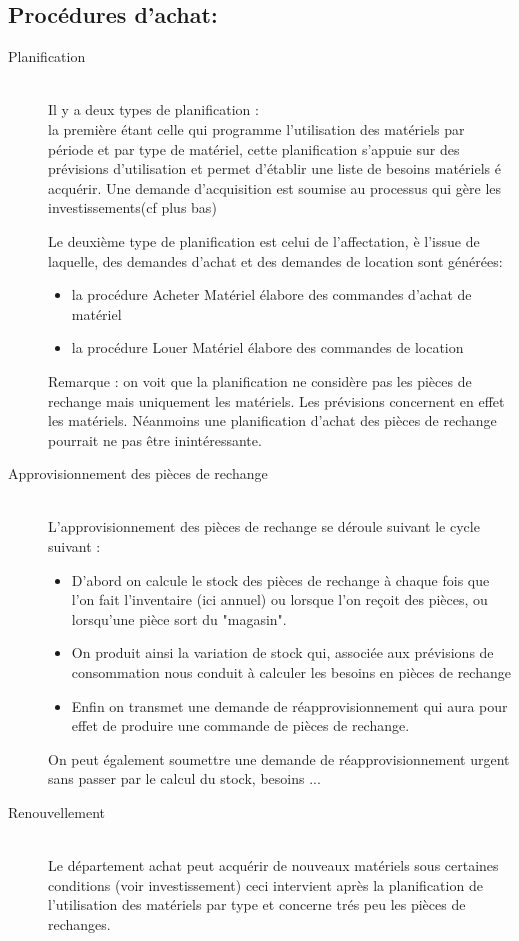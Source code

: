 \subsection{Procédures d'achat:}

\begin{description}
      \item[Planification]~\\

Il y a deux types de planification : \\
la première étant celle qui programme l'utilisation des matériels par période et par type de matériel, cette planification s'appuie sur des prévisions d'utilisation et permet d'établir
une liste de besoins matériels é acquérir. Une demande d'acquisition est soumise au processus qui gère les investissements(cf plus bas)

Le deuxième type de planification est celui de l'affectation, è l'issue de laquelle, des demandes d'achat et des demandes de location sont générées:
\begin{itemize}
\item la procédure Acheter Matériel élabore des commandes d'achat de matériel
\item la procédure Louer Matériel élabore des commandes de location
\end{itemize}

Remarque : on voit que la planification ne considère pas les pièces de rechange mais uniquement les matériels. Les prévisions concernent en effet
les matériels. Néanmoins une planification d'achat des pièces de rechange pourrait ne pas être inintéressante.

    
    \item[Approvisionnement des pièces de rechange]~\\

L'approvisionnement des pièces de rechange se déroule suivant le cycle suivant :
\begin{itemize}
    \item D'abord on calcule le stock des pièces de rechange à chaque fois que l'on fait l'inventaire (ici annuel) ou lorsque l'on reçoit des pièces, ou lorsqu'une pièce sort du "magasin".
    \item On produit ainsi la variation de stock qui, associée aux prévisions de consommation nous conduit à calculer les besoins en pièces de rechange
    \item Enfin on transmet une demande de réapprovisionnement qui aura pour effet de produire une commande de pièces de rechange.
\end{itemize}

On peut également soumettre une demande de réapprovisionnement urgent sans passer par le calcul du stock, besoins ...

    \item[Renouvellement]~\\

Le département achat peut acquérir de nouveaux matériels sous certaines conditions (voir investissement)
ceci intervient après la planification de l'utilisation des matériels par type et concerne trés peu les pièces de rechanges.
\end{description}

